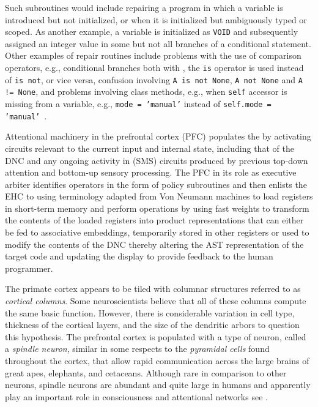 Such subroutines would include repairing a program in which a variable is introduced but not initialized, or when it is initialized but ambiguously typed or scoped. As another example, a variable is initialized as {\tt{VOID}} and subsequently assigned an integer value in some but not all branches of a conditional statement. Other examples of repair routines include problems with the use of comparison operators, e.g., conditional branches both with \hmleq{}, the {\tt{is}} operator is used instead of {\tt{is not}}, or vice versa, confusion involving {\tt{A is not None}}, {\tt{A not None}} and {\tt{A != None}}, and problems involving class methods, e.g., when {\tt{self}} accessor is missing from a variable, e.g., {\tt{mode = 'manual'}} instead of {\tt{self.mode = 'manual'}}~\cite{ShinetalICLR-18b,DevlinetalICLR-18,WangetalCoRR-17}.

Attentional machinery in the prefrontal cortex (PFC) populates the   by activating circuits relevant to the current input and internal state, including that of the DNC and any ongoing activity in (SMS) circuits produced by previous top-down attention and bottom-up sensory processing. The PFC in its role as executive arbiter identifies operators in the form of policy subroutines and then enlists the EHC to \emdash{} using terminology adapted from Von Neumann machines \emdash{} to load registers in short-term memory and perform operations by using fast weights to transform the contents of the loaded registers into product representations that can either be fed to associative embeddings, temporarily stored in other registers or used to modify the contents of the DNC thereby altering the AST representation of the target code and updating the display to provide feedback to the human programmer.


The primate cortex appears to be tiled with columnar structures referred to as {\it{cortical columns}}. Some neuroscientists believe that all of these columns compute the same basic function. However, there is considerable variation in cell type, thickness of the cortical layers, and the size of the dendritic arbors to question this hypothesis. The prefrontal cortex is populated with a type of neuron, called a {\it{spindle neuron}}, similar in some respects to the {\it{pyramidal cells}} found throughout the cortex, that allow rapid communication across the large brains of great apes, elephants, and cetaceans. Although rare in comparison to other neurons, spindle neurons are abundant and quite large in humans and apparently play an important role in consciousness and attentional networks \emdash{} see {{}}.

